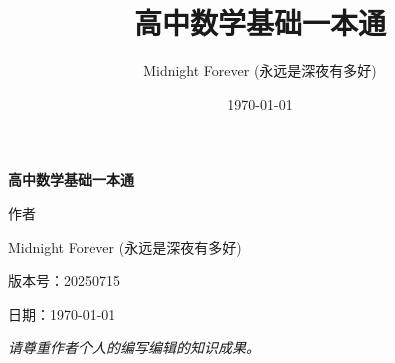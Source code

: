 \documentclass[lang=cn,12pt,chinesefont=founder]{elegantbook}
\title{高中数学基础一本通}
\author{Midnight Forever (永远是深夜有多好)}
\date{\today}
\begin{document}
	
	\maketitle
	
\begin{titlepage}
	\begin{center} 
		
		\vspace*{3cm} 
		
		{\Huge\bfseries\kaishu 高中数学基础一本通\par} 
		
		\vspace{5cm}
		
		{\LARGE 作者\par}
		\vspace{0.7cm}
		{\Large Midnight Forever (永远是深夜有多好)\par}
		
		\vfill 
		
		{\large
			版本号：20250715 \par
			\vspace{0.2cm}
			日期：\today \par
		}
		
		\vspace{2cm}
		
		{\itshape 请尊重作者个人的编写编辑的知识成果。} 
		
	\end{center}
\end{titlepage}
	

	\frontmatter
	\tableofcontents
	
	\mainmatter 

	\pagestyle{fancy}

	\fancyhf{}
	
	\fancyhead[LE]{\leftmark}
	\fancyhead[RO]{\rightmark}
	
	\renewcommand{\headrulewidth}{0.4pt}
	
	
	\fancyfoot[RO,LE]{\thepage}

	
	
	
	
	
\end{document}
